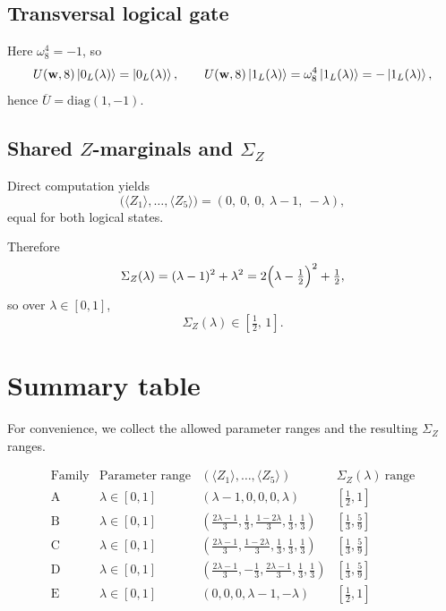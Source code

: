 \documentclass[11pt]{article}
\begin{document}
\subsection{Transversal logical gate}
Here $\omega_8^4=-1$, so
\[
U(\mathbf w,8)\ket{0_L(\lambda)}=\ket{0_L(\lambda)},\qquad
U(\mathbf w,8)\ket{1_L(\lambda)}=\omega_8^4\ket{1_L(\lambda)}=-\ket{1_L(\lambda)},
\]
hence $\overline U=\mathrm{diag}(1,-1)$.

\subsection{Shared $Z$-marginals and $\Sigma_Z$}
Direct computation yields
\[
\boxed{
\bigl(\langle Z_1\rangle,\dots,\langle Z_5\rangle\bigr)
=
(0,\ 0,\ 0,\ \lambda-1,\ -\lambda),
}
\]
equal for both logical states.

Therefore
\[
\Sigma_Z(\lambda)=(\lambda-1)^2+\lambda^2
=2\Bigl(\lambda-\tfrac12\Bigr)^2+\tfrac12,
\]
so over $\lambda\in[0,1]$,
\[
\boxed{\Sigma_Z(\lambda)\in\left[\tfrac12,\,1\right].}
\]

\bigskip

\section{Summary table}

For convenience, we collect the allowed parameter ranges and the resulting $\Sigma_Z$ ranges.

\[
\begin{array}{c|c|c|c}
\text{Family} & \text{Parameter range} & (\langle Z_1\rangle,\dots,\langle Z_5\rangle) & \Sigma_Z(\lambda)\ \text{range}\\
\hline
\text{A} & \lambda\in[0,1] & (\lambda-1,0,0,0,\lambda) & \left[\tfrac12,1\right]\\
\text{B} & \lambda\in[0,1] & \left(\tfrac{2\lambda-1}{3},\tfrac13,\tfrac{1-2\lambda}{3},\tfrac13,\tfrac13\right) & \left[\tfrac13,\tfrac59\right]\\
\text{C} & \lambda\in[0,1] & \left(\tfrac{2\lambda-1}{3},\tfrac{1-2\lambda}{3},\tfrac13,\tfrac13,\tfrac13\right) & \left[\tfrac13,\tfrac59\right]\\
\text{D} & \lambda\in[0,1] & \left(\tfrac{2\lambda-1}{3},-\tfrac13,\tfrac{2\lambda-1}{3},\tfrac13,\tfrac13\right) & \left[\tfrac13,\tfrac59\right]\\
\text{E} & \lambda\in[0,1] & (0,0,0,\lambda-1,-\lambda) & \left[\tfrac12,1\right]
\end{array}
\]
\end{document}
